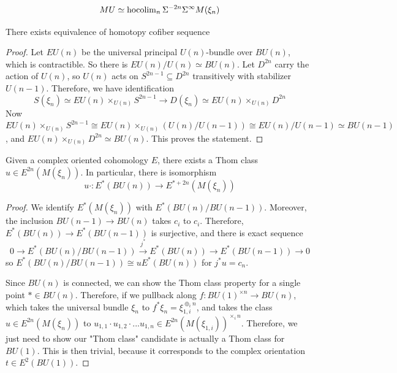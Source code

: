 \[
MU\simeq  \operatorname{hocolim}_n \Sigma^{-2n}\Sigma^{\infty}M(\xi_n)
\]
\begin{lemma}
    There exists equivalence of homotopy cofiber sequence
   \begin{center}
   \end{center}
\end{lemma}\begin{proof}
Let $EU(n)$ be the universal principal $U(n)$-bundle over $BU(n)$, which is contractible. So there is $EU(n)/U(n)\simeq BU(n)$. Let $D^{2n}$ carry the action of $U(n)$, so $U(n)$ acts on $S^{2n-1}\subseteq D^{2n}$ transitively with stabilizer $U(n-1)$. Therefore, we have identification
\[
S(\xi_n)\simeq EU(n)\times _{U(n)}S^{2n-1}\to D(\xi_n)\simeq EU(n)\times_{U(n)}D^{2n}
\]
Now $ EU(n)\times _{U(n)}S^{2n-1}\cong  EU(n)\times _{U(n)}(U(n)/U(n-1))\cong EU(n)/U(n-1)\simeq BU(n-1)$, and $EU(n)\times_{U(n)}D^{2n}\simeq BU(n)$. This proves the statement.
\end{proof}
\begin{proposition}
 \cite{ChrLurie}   Given a complex oriented cohomology $E$, there exists a Thom class $u\in E^{2n}(M(\xi_n))$. In particular, there is isomorphism
    \[
    u\cdot : E^*(BU(n))\to E^{*+2n}(M(\xi_n))
    \]
\end{proposition}
\begin{proof}
    We identify $E^*(M(\xi_n))$ with $E^*(BU(n)/BU(n-1))$. Moreover, the inclusion $BU(n-1)\to BU(n)$ takes $c_i$ to $c_i$. Therefore, $E^*(BU(n))\to E^*(BU(n-1))$ is surjective, and there is exact sequence
    \[
    0\to E^*(BU(n)/BU(n-1))\xrightarrow{j^*} E^*(BU(n))\to E^*(BU(n-1))\to 0
    \]so $E^*(BU(n)/BU(n-1))\cong uE^*(BU(n))$ for $j^*u=c_n$.

    Since $BU(n)$ is connected, we can show the Thom class property for a single point $*\in BU(n)$. Therefore, if we pullback along $f:BU(1)^{\times n}\to BU(n)$, which takes the universal bundle $\xi_n$ to $f^*\xi_n= \xi_{1,i}^{\oplus_i n}$, and takes the class $u\in E^{2n}(M(\xi_n))$ to $u_{1,1}\cdot u_{1,2}\cdot ...u_{1,n}\in E^{2n}(M(\xi_{1,i}))^{\times_i n}$. Therefore, we just need to show our "Thom class" candidate is actually a Thom class for $BU(1)$. This is then trivial, because it corresponds to the complex orientation $t\in E^2(BU(1))$.
\end{proof}

